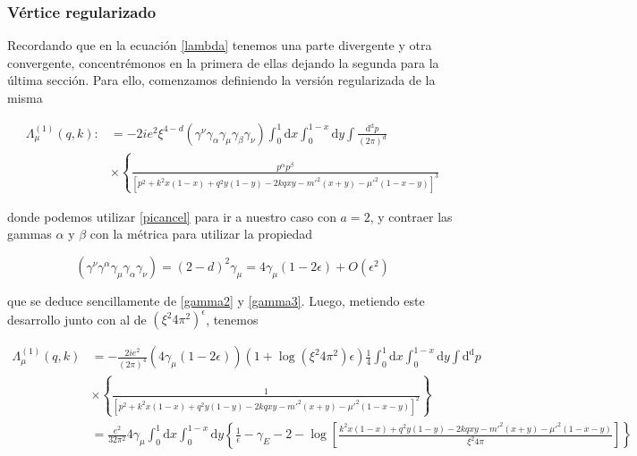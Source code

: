 \documentclass[tickz]{article}
\numberwithin{equation}{section}
\begin{document}
\subsubsection{Vértice regularizado}

Recordando que en la ecuación \ref{lambda} tenemos una parte divergente y otra convergente, concentrémonos en la primera de ellas dejando la segunda para la última sección. Para ello, comenzamos definiendo la versión regularizada de la misma

\begin{equation}
\begin{aligned}
\Lambda^{(1)}_{\mu}(q,k):&=-2ie^2 \xi^{4-d} \left(\gamma^{\nu}\gamma_{\alpha}\gamma_{\mu} \gamma_{\beta} \gamma_{\nu}\right) \int_0^1\mathrm{d}x\int_0^{1-x}\mathrm{d}y \int \frac{\mathrm{d^d}p}{(2\pi)^d}\\
&\times \left\{ \frac{  p^{\alpha}p^{\beta}}{\left[p^2 + k^2x(1-x) +q^2y(1-y) -2kqxy -m'^2(x+y) -\mu'^2(1-x-y)\right]^3} \right.
\end{aligned}
\end{equation}

donde podemos utilizar \ref{picancel} para ir a nuestro caso con $ a=2 $, y contraer las gammas $ \alpha $ y $ \beta $ con la métrica para utilizar la propiedad

\begin{equation}\label{key}
\left(\gamma^{\nu}\gamma^{\alpha}\gamma_{\mu} \gamma_{\alpha} \gamma_{\nu}\right) = (2-d)^2 \gamma_{\mu} = 4\gamma_{\mu} (1-2\epsilon) + O(\epsilon^2)
\end{equation}

que se deduce sencillamente de \ref{gamma2} y \ref{gamma3}. Luego, metiendo este desarrollo junto con al de $ \left(\xi^2 4\pi^2\right)^{\epsilon} $, tenemos

\begin{equation}
\begin{aligned}
\Lambda^{(1)}_{\mu}(q,k)&=-\frac{2ie^2}{(2\pi)^4} \left(4\gamma_{\mu} (1-2\epsilon)\right)\left( 1 + \log\left(\xi^2 4\pi^2\right) \epsilon\right) \frac{1}{4}\int_0^1\mathrm{d}x\int_0^{1-x}\mathrm{d}y \int \mathrm{d^d}p\\
&\times \left\{ \frac{  1}{\left[p^2 + k^2x(1-x) +q^2y(1-y) -2kqxy -m'^2(x+y) -\mu'^2(1-x-y)\right]^2} \right\}\\
&=\frac{e^2}{32\pi^2} 4\gamma_{\mu} \int_0^1\mathrm{d}x\int_0^{1-x}\mathrm{d}y \left\{ \frac{1}{\epsilon} - \gamma_E - 2 - \log\left[\frac{k^2x(1-x) +q^2y(1-y) -2kqxy -m'^2(x+y) -\mu'^2(1-x-y)}{\xi^2 4\pi}\right]\right\}
\end{aligned}
\end{equation}
\end{document}

